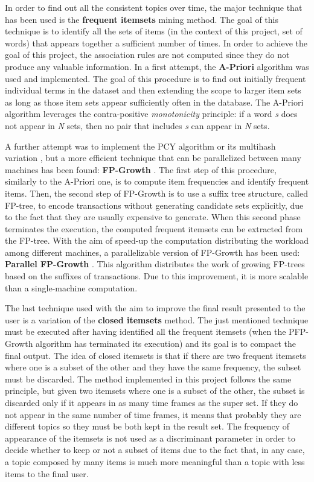 In order to find out all the consistent topics over time, the major technique that has been used is the \textbf{frequent itemsets} mining method. The goal of this technique is to identify all the sets of items (in the context of this project, set of words) that appears together a sufficient number of times. In order to achieve the goal of this project, the association rules are not computed since they do not produce any valuable information. In a first attempt, the \textbf{A-Priori} algorithm \cite{apriori-algorithm} was used and implemented. The goal of this procedure is to find out initially frequent individual terms in the dataset and then extending the scope to larger item sets as long as those item sets appear sufficiently often in the database. The A-Priori algorithm leverages the contra-positive \textit{monotonicity} principle: if a word \textit{s} does not appear in \textit{N} sets, then no pair that includes \textit{s} can appear in \textit{N} sets.

\noindent A further attempt was to implement the PCY algorithm or its multihash variation \cite{pcy-multihash-algorithms}, but a more efficient technique that can be parallelized between many machines has been found: \textbf{FP-Growth} \cite{fpgrowth-paper}. The first step of this procedure, similarly to the A-Priori one, is to compute item frequencies and identify frequent items. Then, the second step of FP-Growth is to use a suffix tree structure, called FP-tree, to encode transactions without generating candidate sets explicitly, due to the fact that they are usually expensive to generate. When this second phase terminates the execution, the computed frequent itemsets can be extracted from the FP-tree. With the aim of speed-up the computation distributing the workload among different machines, a parallelizable version of FP-Growth has been used: \textbf{Parallel FP-Growth} \cite{pfpgrowth-paper}. This algorithm distributes the work of growing FP-trees based on the suffixes of transactions. Due to this improvement, it is more scalable than a single-machine computation.

\noindent The last technique used with the aim to improve the final result presented to the user is a variation of the \textbf{closed itemsets} method. The just mentioned technique must be executed after having identified all the frequent itemsets (when the PFP-Growth algorithm has terminated its execution) and its goal is to compact the final output. The idea of closed itemsets is that if there are two frequent itemsets where one is a subset of the other and they have the same frequency, the subset must be discarded. The method implemented in this project follows the same principle, but given two itemsets where one is a subset of the other, the subset is discarded only if it appears in as many time frames as the super set. If they do not appear in the same number of time frames, it means that probably they are different topics so they must be both kept in the result set. The frequency of appearance of the itemsets is not used as a discriminant parameter in order to decide whether to keep or not a subset of items due to the fact that, in any case, a topic composed by many items is much more meaningful than a topic with less items to the final user.

